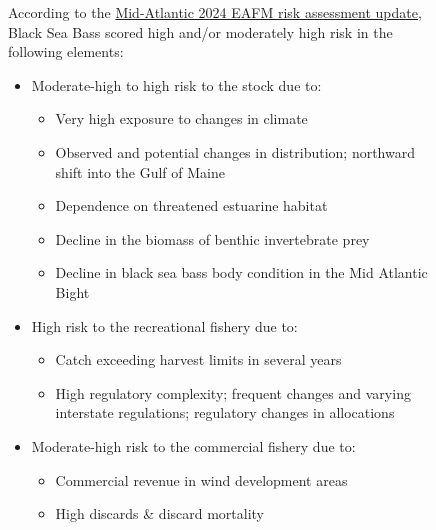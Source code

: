\documentclass[
  10pt,
  letterpaper,
  DIV=11,
  numbers=noendperiod]{scrartcl}
\providecommand{\tightlist}{%
  \setlength{\itemsep}{0pt}\setlength{\parskip}{0pt}}\usepackage{longtable,booktabs,array}
\begin{document}
\begin{figure}
\begin{minipage}[t]{0.03\linewidth}
{\centering 

}

\end{minipage}%
%
\begin{minipage}[t]{0.40\linewidth}

{\centering 

According to the
\href{https://static1.squarespace.com/static/511cdc7fe4b00307a2628ac6/t/6747560a3cf66936045e5547/1732728332670/05_EAFM+Risk+Assessment.pdf}{Mid-Atlantic
2024 EAFM risk assessment update}, Black Sea Bass scored high and/or
moderately high risk in the following elements:

}

\end{minipage}%
\newline
\begin{minipage}[t]{0.57\linewidth}

{\centering 

\begin{itemize}
\tightlist
\item
  Moderate-high to high risk to the stock due to:

  \begin{itemize}
  \tightlist
  \item
    Very high exposure to changes in climate
  \item
    Observed and potential changes in distribution; northward shift into
    the Gulf of Maine
  \item
    Dependence on threatened estuarine habitat
  \item
    Decline in the biomass of benthic invertebrate prey
  \item
    Decline in black sea bass body condition in the Mid Atlantic Bight
  \end{itemize}
\item
  High risk to the recreational fishery due to:

  \begin{itemize}
  \tightlist
  \item
    Catch exceeding harvest limits in several years
  \item
    High regulatory complexity; frequent changes and varying interstate
    regulations; regulatory changes in allocations
  \end{itemize}
\item
  Moderate-high risk to the commercial fishery due to:

  \begin{itemize}
  \tightlist
  \item
    Commercial revenue in wind development areas
  \item
    High discards \& discard mortality
  \end{itemize}
\end{itemize}

}
\end{minipage}
\end{figure}
\end{document}
